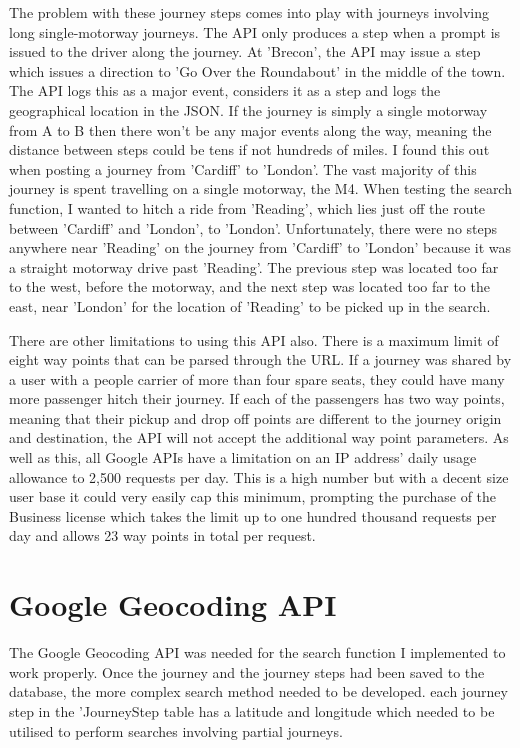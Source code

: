 	The problem with these journey steps comes into play with journeys involving long single-motorway journeys. The API only produces a step when a prompt is issued to the driver along the journey. At 'Brecon', the API may issue a step which issues a direction to 'Go Over the Roundabout' in the middle of the town. The API logs this as a major event, considers it as a step and logs the geographical location in the JSON. If the journey is simply a single motorway from A to B then there won't be any major events along the way, meaning the distance between steps could be tens if not hundreds of miles. I found this out when posting a journey from 'Cardiff' to 'London'. The vast majority of this journey is spent travelling on a single motorway, the M4. When testing the search function, I wanted to hitch a ride from 'Reading', which lies just off the route between 'Cardiff' and 'London', to 'London'. Unfortunately, there were no steps anywhere near 'Reading' on the journey from 'Cardiff' to 'London' because it was a straight motorway drive past 'Reading'. The previous step was located too far to the west, before the motorway, and the next step was located too far to the east, near 'London' for the location of 'Reading' to be picked up in the search.
	
	There are other limitations to using this API also. There is a maximum limit of eight way points that can be parsed through the URL. If a journey was shared by a user with a people carrier of more than four spare seats, they could have many more passenger hitch their journey. If each of the passengers has two way points, meaning that their pickup and drop off points are different to the journey origin and destination, the API will not accept the additional way point parameters. As well as this, all Google APIs have a limitation on an IP address' daily usage allowance to 2,500 requests per day. This is a high number but with a decent size user base it could very easily cap this minimum, prompting the purchase of the Business license\cite{google_api_allowance} which takes the limit up to one hundred thousand requests per day and allows 23 way points in total per request.
	
\section{Google Geocoding API}
	The Google Geocoding API\cite{google_geocoding_api} was needed for the search function I implemented to work properly. Once the journey and the journey steps had been saved to the database, the more complex search method needed to be developed. each journey step in the 'Journey\textunderscore Step table has a latitude and longitude which needed to be utilised to perform searches involving partial journeys. 
	
